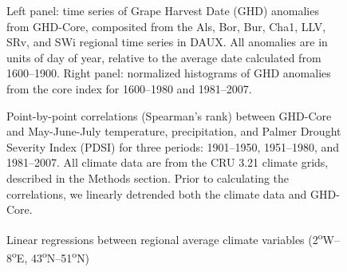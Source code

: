 \documentclass{nature}
\begin{document}
\begin{figure}
\caption{Left panel: time series of Grape Harvest Date (GHD) anomalies from GHD-Core, composited from the Als, Bor, Bur, Cha1, LLV, SRv, and SWi regional time series in DAUX. All anomalies are in units of day of year, relative to the average date calculated from 1600--1900. Right panel: normalized histograms of GHD anomalies from the core index for 1600--1980 and 1981--2007.}
\end{figure}

\begin{figure}
\caption{Point-by-point correlations (Spearman's rank) between GHD-Core and May-June-July temperature, precipitation, and Palmer Drought Severity Index (PDSI) for three periods: 1901--1950, 1951--1980, and 1981--2007. All climate data are from the CRU 3.21 climate grids, described in the Methods section. Prior to calculating the correlations, we linearly detrended both the climate data and GHD-Core.}
\end{figure}

\begin{figure}
\caption{Linear regressions between regional average climate variables (2\textsuperscript{o}W--8\textsuperscript{o}E, 43\textsuperscript{o}N--51\textsuperscript{o}N)}
\end{figure}


\end{document}

